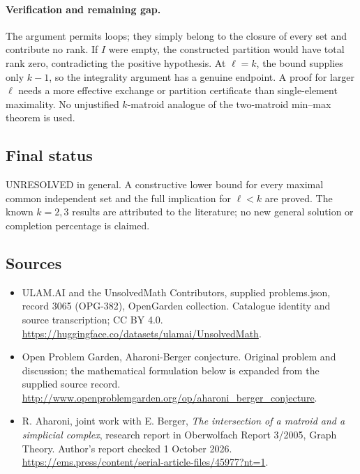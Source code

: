 \documentclass[11pt,a4paper]{article}
\begin{document}
\paragraph{Verification and remaining gap.}
The argument permits loops; they simply belong to the closure of every
set and contribute no rank. If $I$ were empty, the constructed partition
would have total rank zero, contradicting the positive hypothesis.
At $\ell=k$, the bound supplies only $k-1$, so the integrality argument
has a genuine endpoint. A proof for larger $\ell$ needs a more effective
exchange or partition certificate than single-element maximality. No
unjustified $k$-matroid analogue of the two-matroid min--max theorem is used.

\subsection{Final status}
UNRESOLVED in general. A constructive lower bound for every maximal
common independent set and the full implication for $\ell<k$ are
proved. The known $k=2,3$ results are attributed to the literature;
no new general solution or completion percentage is claimed.

\subsection{Sources}
\begin{itemize}
\item[S1] ULAM.AI and the UnsolvedMath Contributors, supplied problems.json, record 3065 (OPG-382), OpenGarden collection. Catalogue identity and source transcription; CC BY 4.0.
\url{https://huggingface.co/datasets/ulamai/UnsolvedMath}.
\item[S2] Open Problem Garden, Aharoni-Berger conjecture. Original problem and discussion; the mathematical formulation below is expanded from the supplied source record.
\url{http://www.openproblemgarden.org/op/aharoni_berger_conjecture}.
\item[S3] R. Aharoni, joint work with E. Berger, \emph{The intersection of a matroid and a simplicial complex}, research report in Oberwolfach Report 3/2005, Graph Theory. Author's report checked 1 October 2026.
\url{https://ems.press/content/serial-article-files/45977?nt=1}.
\end{itemize}
\end{document}
